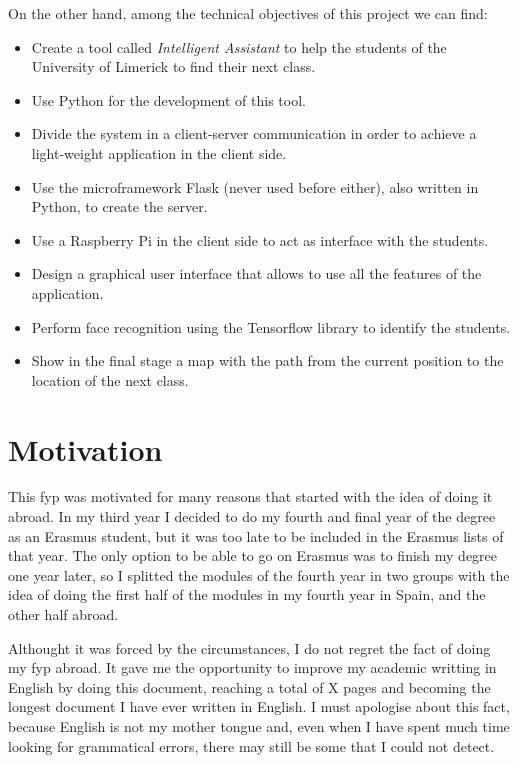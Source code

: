 On the other hand, among the technical objectives of this project we can find:
\begin{itemize}
	\item Create a tool called \textit{Intelligent Assistant} to help the students of the University of Limerick to find their next class.
	\item Use Python for the development of this tool.
	\item Divide the system in a client-server communication in order to achieve a light-weight application in the client side.
	\item Use the microframework Flask (never used before either), also written in Python, to create the server.
	\item Use a Raspberry Pi in the client side to act as interface with the students.
	\item Design a graphical user interface that allows to use all the features of the application.
	\item Perform face recognition using the Tensorflow library to identify the students.
	\item Show in the final stage a map with the path from the current position to the location of the next class.
\end{itemize}

\section{Motivation}
This \gls{fyp} was motivated for many reasons that started with the idea of doing it abroad. In my third year I decided to do my fourth and final year of the degree as an Erasmus student, but it was too late to be included in the Erasmus lists of that year. The only option to be able to go on Erasmus was to finish my degree one year later, so I splitted the modules of the fourth year in two groups with the idea of doing the first half of the modules in my fourth year in Spain, and the other half abroad. 

Althought it was forced by the circumstances, I do not regret the fact of doing my \gls{fyp} abroad. It gave me the opportunity to improve my academic writting in English by doing this document, reaching a total of X pages and becoming the longest document I have ever written in English. I must apologise about this fact, because English is not my mother tongue and, even when I have spent much time looking for grammatical errors, there may still be some that I could not detect.

